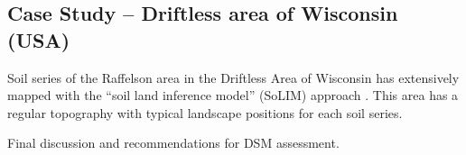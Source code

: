 \documentclass[soil, manuscript]{copernicus}
\begin{document}
\subsection{Case Study -- Driftless area of Wisconsin (USA)}

Soil series of the Raffelson  area in the Driftless Area of Wisconsin has extensively mapped with the ``soil land inference model'' (SoLIM) approach \citep{Zhu.etal2001,zhuPredictionSoilProperties2010}.
%
This area has a regular topography with typical landscape positions for each soil series.




\conclusions[Discussion]  %
%
Final discussion and recommendations for DSM assessment.













\end{document}
